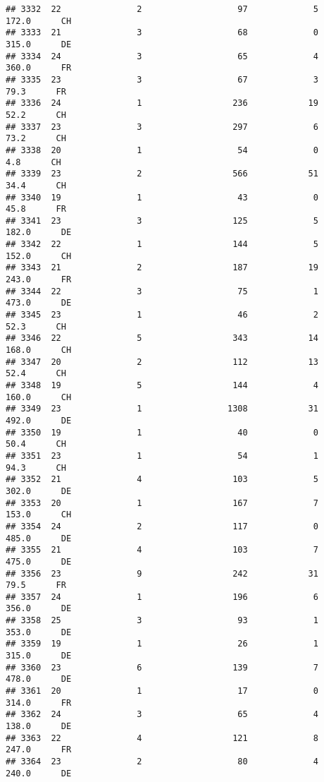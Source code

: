 \documentclass[
]{article}
\begin{document}
\begin{verbatim}
## 3332  22               2                   97             5    172.0      CH
## 3333  21               3                   68             0    315.0      DE
## 3334  24               3                   65             4    360.0      FR
## 3335  23               3                   67             3     79.3      FR
## 3336  24               1                  236            19     52.2      CH
## 3337  23               3                  297             6     73.2      CH
## 3338  20               1                   54             0      4.8      CH
## 3339  23               2                  566            51     34.4      CH
## 3340  19               1                   43             0     45.8      FR
## 3341  23               3                  125             5    182.0      DE
## 3342  22               1                  144             5    152.0      CH
## 3343  21               2                  187            19    243.0      FR
## 3344  22               3                   75             1    473.0      DE
## 3345  23               1                   46             2     52.3      CH
## 3346  22               5                  343            14    168.0      CH
## 3347  20               2                  112            13     52.4      CH
## 3348  19               5                  144             4    160.0      CH
## 3349  23               1                 1308            31    492.0      DE
## 3350  19               1                   40             0     50.4      CH
## 3351  23               1                   54             1     94.3      CH
## 3352  21               4                  103             5    302.0      DE
## 3353  20               1                  167             7    153.0      CH
## 3354  24               2                  117             0    485.0      DE
## 3355  21               4                  103             7    475.0      DE
## 3356  23               9                  242            31     79.5      FR
## 3357  24               1                  196             6    356.0      DE
## 3358  25               3                   93             1    353.0      DE
## 3359  19               1                   26             1    315.0      DE
## 3360  23               6                  139             7    478.0      DE
## 3361  20               1                   17             0    314.0      FR
## 3362  24               3                   65             4    138.0      DE
## 3363  22               4                  121             8    247.0      FR
## 3364  23               2                   80             4    240.0      DE

\end{verbatim}
\end{document}
